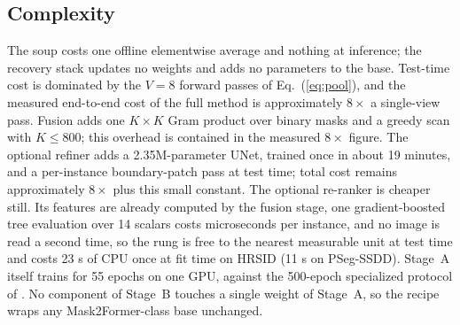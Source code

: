 \subsection{Complexity}\label{sec:complexity}

The soup costs one offline elementwise average and nothing at inference; the recovery stack updates no weights and adds no parameters to the base. Test-time cost is dominated by the $V=8$ forward passes of Eq.~(\ref{eq:pool}), and the measured end-to-end cost of the full method is approximately $8\times$ a single-view pass. Fusion adds one $K\times K$ Gram product over binary masks and a greedy scan with $K\le 800$; this overhead is contained in the measured $8\times$ figure. The optional refiner adds a 2.35M-parameter UNet, trained once in about 19 minutes, and a per-instance boundary-patch pass at test time; total cost remains approximately $8\times$ plus this small constant. The optional re-ranker is cheaper still. Its features are already computed by the fusion stage, one gradient-boosted tree evaluation over 14 scalars costs microseconds per instance, and no image is read a second time, so the rung is free to the nearest measurable unit at test time and costs 23 s of CPU once at fit time on HRSID (11 s on PSeg-SSDD). Stage~A itself trains for 55 epochs on one GPU, against the 500-epoch specialized protocol of \cite{o2former2025}. No component of Stage~B touches a single weight of Stage~A, so the recipe wraps any Mask2Former-class base unchanged.
